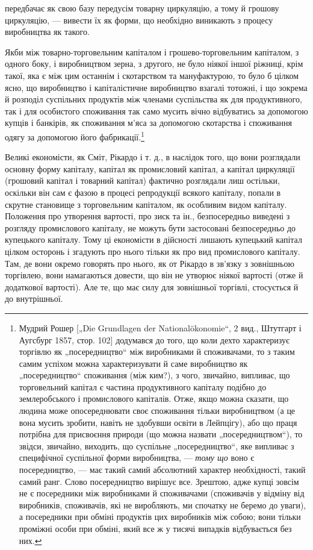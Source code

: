 \parcont{}  %
передбачає як свою базу передусім товарну циркуляцію, а тому
й грошову циркуляцію, — вивести їх як форми, що необхідно
виникають з процесу виробництва як такого.

Якби між товарно-торговельним капіталом і грошево-торговельним
капіталом, з одного боку, і виробництвом зерна, з
другого, не було ніякої іншої ріжниці, крім такої, яка є між цим
останнім і скотарством та мануфактурою, то було б цілком
ясно, що виробництво і капіталістичне виробництво взагалі
тотожні, і що зокрема й розподіл суспільних продуктів між членами
суспільства як для продуктивного, так і для особистого
споживання так само мусить вічно відбуватись за допомогою
купців і банкірів, як споживання м’яса за допомогою скотарства
і споживання одягу за допомогою його фабрикації.\footnote{
Мудрий Рошер [„Die Grundlagen der Nationalökonomie“, 2 вид., Штутгарт
і Аугсбург 1857, стор. 102] додумався до того, що коли дехто характеризує
торгівлю як „посередництво“ між виробниками й споживачами, то з таким самим
успіхом можна характеризувати й саме виробництво як „посередництво“
споживання (між ким?), з чого, звичайно, випливає, що торговельний капітал
є частина продуктивного капіталу подібно до землеробського і промислового
капіталів. Отже, якщо можна сказати, що людина може опосереднювати своє
споживання тільки виробництвом (а це вона мусить зробити, навіть не здобувши
освіти в Лейпцігу), або що праця потрібна для присвоєння природи (що можна
назвати „посередництвом“), то звідси, звичайно, виходить, що суспільне „посередництво“, яке випливає
з специфічної суспільної форми виробництва, — \emph{тому
що} воно є посередництво, — має такий самий абсолютний характер необхідності,
такий самий ранг. Слово посередництво вирішує все. Зрештою, адже купці зовсім
не є посередники між виробниками й споживачами (споживачів у відміну від виробників, споживачів, які
не виробляють, ми спочатку не беремо до уваги), а посередники при обміні продуктів цих виробників
між собою; вони тільки проміжні
особи при обміні, який все ж у тисячі випадків відбувається без них.
}

Великі економісти, як Сміт, Рікардо і т. д., в наслідок того,
що вони розглядали основну форму капіталу, капітал як промисловий
капітал, а капітал циркуляції (грошовий капітал і товарний
капітал) фактично розглядали лиш остільки, оскільки він
сам є фазою в процесі репродукції всякого капіталу, попали в
скрутне становище з торговельним капіталом, як особливим видом
капіталу. Положення про утворення вартості, про зиск та
ін., безпосередньо виведені з розгляду промислового капіталу,
не можуть бути застосовані безпосередньо до купецького капіталу.
Тому ці економісти в дійсності лишають купецький капітал
цілком осторонь і згадують про нього тільки як про вид
промислового капіталу. Там, де вони окремо говорять про
нього, як от Рікардо в зв’язку з зовнішньою торгівлею, вони
намагаються довести, що він не утворює ніякої вартості (отже
й додаткової вартості). Але те, що має силу для зовнішньої
торгівлі, стосується й до внутрішньої.

